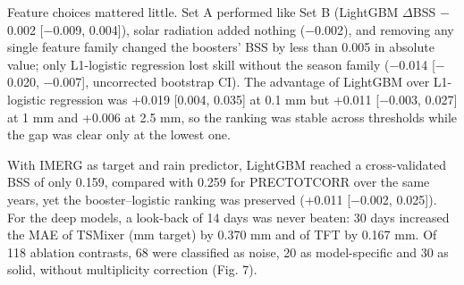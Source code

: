 \documentclass[
]{article}
\begin{document}
Feature choices mattered little. Set A performed like Set B (LightGBM $\Delta$BSS $-$0.002 {[}$-$0.009, 0.004{]}), solar radiation added nothing ($-$0.002), and removing any single feature family changed the boosters' BSS by less than 0.005 in absolute value; only L1-logistic regression lost skill without the season family ($-$0.014 {[}$-$0.020, $-$0.007{]}, uncorrected bootstrap CI).  %
The advantage of LightGBM over L1-logistic regression was +0.019 {[}0.004, 0.035{]} at 0.1 mm but +0.011 {[}$-$0.003, 0.027{]} at 1 mm and +0.006 at 2.5 mm, so the ranking was stable across thresholds while the gap was clear only at the lowest one.  %

With IMERG as target and rain predictor, LightGBM reached a cross-validated BSS of only 0.159, compared with 0.259 for PRECTOTCORR over the same years, yet the booster--logistic ranking was preserved (+0.011 {[}$-$0.002, 0.025{]}).  %
For the deep models, a look-back of 14 days was never beaten: 30 days increased the MAE of TSMixer (mm target) by 0.370 mm and of TFT by 0.167 mm.  %
Of 118 ablation contrasts, 68 were classified as noise, 20 as model-specific and 30 as solid, without multiplicity correction (Fig. 7).  %
\end{document}
